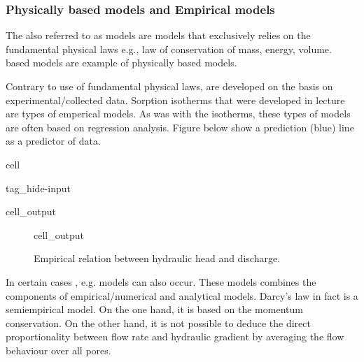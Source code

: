 \documentclass[letterpaper,10pt,english]{jupyterBook}
\begin{document}
\subsubsection{Physically based models and Empirical models}
\label{\detokenize{content/modeling/31_intro_modeling:physically-based-models-and-empirical-models}}
\sphinxAtStartPar
The  also referred to as  models are models that exclusively relies on the fundamental physical laws \sphinxhyphen{} e.g., law of conservation of mass, energy, volume.   based models are example of physically based models.

\sphinxAtStartPar
Contrary to use of fundamental physical laws,  are developed on the basis on experimental/collected data. Sorption isotherms that were developed in lecture  are types of emperical models. As was with the isotherms, these types of models are often based on regression analysis. Figure below show a prediction (blue) line as a predictor of data.

\begin{sphinxuseclass}{cell}
\begin{sphinxuseclass}{tag_hide-input}\begin{sphinxVerbatimOutput}

\begin{sphinxuseclass}{cell_output}
\end{sphinxuseclass}\end{sphinxVerbatimOutput}

\end{sphinxuseclass}
\end{sphinxuseclass}
\begin{figure}[htbp]
\centering
\capstart
\begin{sphinxVerbatimOutput}

\begin{sphinxuseclass}{cell_output}
\noindent{}

\end{sphinxuseclass}\end{sphinxVerbatimOutput}
\caption{Empirical relation between hydraulic head and discharge.}\label{\detokenize{content/modeling/31_intro_modeling:empirical}}\end{figure}

\sphinxAtStartPar
In certain cases , e.g.  models can also occur. These models combines the components of empirical/numerical and analytical models. Darcy’s law in fact is a semi\sphinxhyphen{}empirical model. On the one hand, it is based on the momentum conservation.  On the other hand, it is not possible to  deduce the direct proportionality between flow rate and hydraulic gradient by averaging the flow behaviour over all pores.
\end{document}

